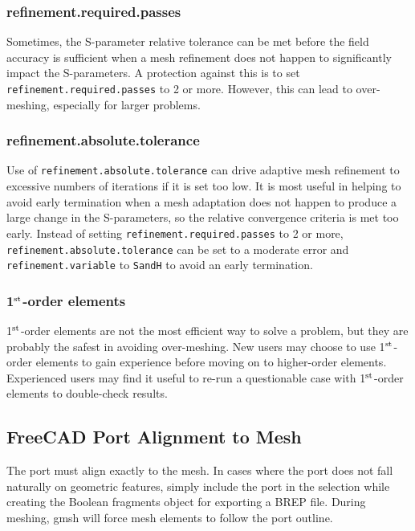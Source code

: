 \documentclass[titlepage]{article}
\renewcommand\_{\textunderscore\linebreak[1]}
\begin{document}
\subsubsection{refinement.required.passes}

Sometimes, the S-parameter relative tolerance can be met before the field accuracy is sufficient when a mesh refinement does not happen to significantly impact the S-parameters.  A protection against this is to set \texttt{refinement.required.passes} to 2 or more.  However, this can lead to over-meshing, especially for larger problems.

\subsubsection{refinement.absolute.tolerance}

Use of \texttt{refinement.absolute.tolerance} can drive adaptive mesh refinement to excessive numbers of iterations if it is set too low.  It is most useful in helping to avoid early termination when a mesh adaptation does not happen to produce a large change in the S-parameters, so the relative convergence criteria is met too early.  Instead of setting \texttt{refinement.required.passes} to 2 or more, \texttt{refinement.absolute.tolerance} can be set to a moderate error and \texttt{refinement.variable} to \texttt{SandH} to avoid an early termination.

\subsubsection{1$^{\textnormal{st}}$-order elements}

1$^{\textnormal{st}}$-order elements are not the most efficient way to solve a problem, but they are probably the safest in avoiding over-meshing.  New users may choose to use 1$^{\textnormal{st}}$-order elements to gain experience before moving on to higher-order elements.  Experienced users may find it useful to re-run a questionable case with 1$^{\textnormal{st}}$-order elements to double-check results.

\subsection{FreeCAD Port Alignment to Mesh}

The port must align exactly to the mesh.  In cases where the port does not fall naturally on geometric features, simply include the port in the selection while creating the Boolean fragments object for exporting a BREP file.  During meshing, gmsh will force mesh elements to follow the port outline.
\end{document}
